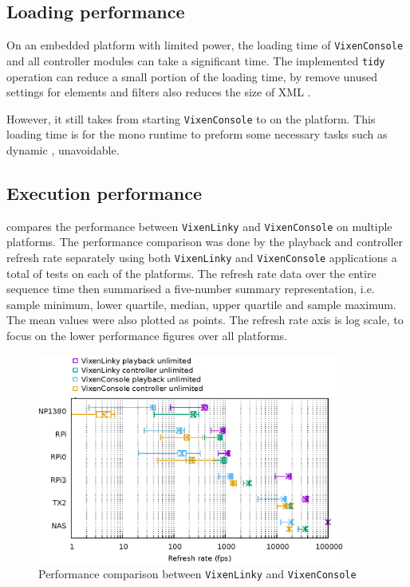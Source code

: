 \subsection{Loading performance}

On an embedded platform with limited  power, the loading time of \texttt{VixenConsole} and all controller modules can take a significant time. The implemented \texttt{tidy} operation can reduce a small portion of the loading time, by remove unused settings for elements and filters also reduces the size of XML .

However, it still takes  from starting \texttt{VixenConsole} to  on the  platform. This loading time is for the mono runtime to preform some necessary tasks such as dynamic ,  unavoidable.

\subsection{Execution performance}

 compares the performance between \texttt{VixenLinky} and \texttt{VixenConsole} on multiple platforms. The performance comparison was done by  the playback and controller refresh rate separately using both \texttt{VixenLinky} and \texttt{VixenConsole} applications\ca{;} a total of  tests on each of the platforms. The refresh rate data over the entire sequence time  then summarised  a five-number summary representation, i.e. sample minimum, lower quartile, median, upper quartile and sample maximum. The mean values were also plotted as points. The refresh rate axis is log scale, to focus on the lower performance figures over all platforms.

\begin{figure}[t]
  \centering
  \includegraphics[width=0.9\textwidth]{Figs/raw-seq-p-c.eps}
  \caption{\footnotesize Performance comparison between \texttt{VixenLinky} and \texttt{VixenConsole}}
  \label{fig:raw-seq-p-c}
\end{figure}

